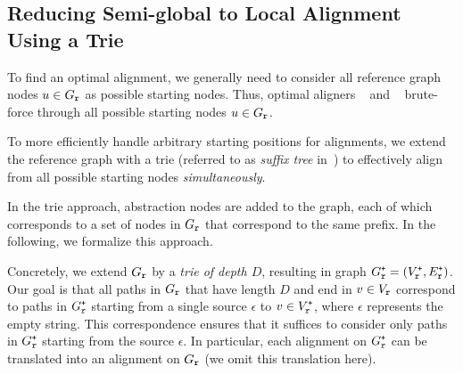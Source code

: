 \subsection{Reducing Semi-global to Local Alignment Using a Trie} \label{subsec:trie}
To find an optimal alignment, we generally need to consider all reference graph
nodes $u \in G_\texttt{r}$ as possible starting nodes. Thus, optimal aligners
\pasgal~\cite{jain_accelerating_2019} and
\bitparallel~\cite{rautiainen_bitparallel_2019} brute-force through all
possible starting nodes $u \in G_\texttt{r}$.

To more efficiently handle arbitrary starting positions for alignments, we
extend the reference graph with a trie (referred to as \textit{suffix tree}
in~\cite{dox2018efficient}) to effectively align from all possible starting
nodes \emph{simultaneously}.

In the trie approach, abstraction nodes are added to the graph, each of which
corresponds to a set of nodes in $G_\texttt{r}$ that correspond to the same prefix. In
the following, we formalize this approach.

Concretely, we extend $G_\texttt{r}$ by a \emph{trie of depth $D$}, resulting in graph
$G_\texttt{r}^\texttt{+}=(V_\texttt{r}^\texttt{+},E_\texttt{r}^\texttt{+})$. Our goal is that all paths in $G_\texttt{r}$ that have length $D$ and
end in $v \in V_\texttt{r}$ correspond to paths in $G_\texttt{r}^\texttt{+}$ starting from a single source
$\epsilon$ to $v \in V_\texttt{r}^\texttt{+}$, where $\epsilon$ represents the empty string. This
correspondence ensures that it suffices to consider only paths in $G_\texttt{r}^\texttt{+}$ starting
from the source $\epsilon$. In particular, each alignment on $G_\texttt{r}^\texttt{+}$ can
be translated into an alignment on $G_\texttt{r}$ (we omit this translation
here).


